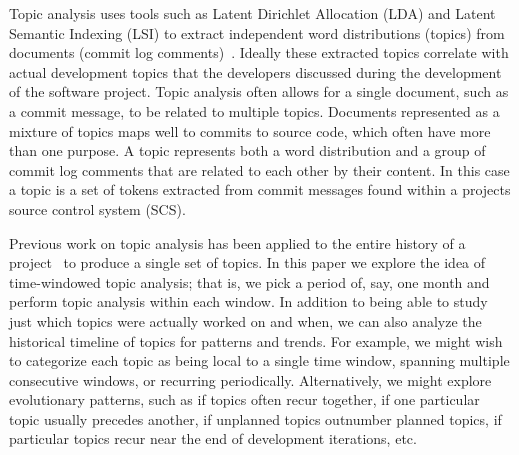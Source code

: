 \documentclass[times, 10pt,twocolumn]{article}
\begin{document}



Topic analysis 
uses tools such as Latent Dirichlet Allocation (LDA) and Latent Semantic Indexing (LSI) to extract
independent word distributions (topics) from
documents (commit log comments)~\cite{1374321-short,10.1109/ICPC.2007.13-short,lukins2008,10.1109/MSR.2007.20-short}.
Ideally these extracted topics 
correlate with actual development topics that the developers discussed
during the development of the software project. 
Topic analysis often allows for a single document, such as a commit
message, to be related to multiple topics. Documents represented as a mixture of topics maps well to commits
to source code, which often have more than one purpose.  A topic
represents both a word distribution and a group of commit log comments
that are related to each other by their content.  In this case a topic
is a set of tokens extracted from commit messages found within a
projects source control system (SCS). 


Previous work on topic analysis has been applied to the entire history of a 
project~\cite{1321709-short,lukins2008,10.1109/ICPC.2007.13-short}
to produce a single set of topics. In this paper we explore the idea
of time-windowed topic analysis; that is, we pick a period of, say,
one month and perform topic analysis within each window.  In addition
to being able to study just which topics were actually worked on and
when, we can also analyze the historical timeline of topics for
patterns and trends.  For example, we might wish to categorize each
topic as being local to a single time window, spanning multiple
consecutive windows, or recurring periodically.  Alternatively, we
might explore evolutionary patterns, such as if topics often recur together, if one particular
topic usually precedes another, if unplanned topics outnumber planned
topics, if particular topics recur near the end of development
iterations, etc. %
\end{document}
